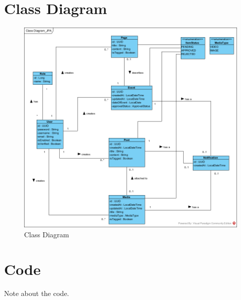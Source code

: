 \documentclass{article}
\begin{document}
\section{Class Diagram}
\begin{figure}[H]
    \centering
    \includegraphics[width=.98\textwidth]{images/ClassDiagram.png}
    \centering
    \caption{Class Diagram}
\end{figure}%
\section{Code}
Note about the code.
\end{document}
